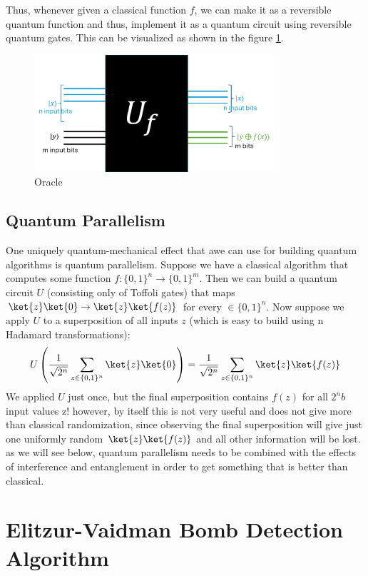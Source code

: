 \documentclass[12pt, oneside]{book}
\theoremstyle{definition}
\theoremstyle{definition}
\theoremstyle{remark}
\begin{document}
Thus, whenever given a classical function $f$, we can make it as a reversible quantum function and thus, implement
it as a quantum circuit using reversible quantum gates. This can be visualized as shown in the figure \ref{oracle}.
\begin{figure}[H]
    \centering
    \includegraphics[width=0.8\textwidth]{../images/oracle.png}
    \caption{Oracle}
    \label{oracle}
\end{figure}

\section{Quantum Parallelism}
One uniquely quantum-mechanical effect that awe can use for building quantum algorithms is quantum parallelism. Suppose we have a classical algorithm that computes some function $f:\{0,1\}^n \rightarrow \{0,1\}^m$. Then we can build a quantum circuit $U$ (consisting only of Toffoli gates) that maps $\ket{z}\ket{0}\rightarrow \ket{z}\ket{f(z)}$ for every $ \in \{0,1\}^n$. Now suppose we apply $U$ to a superposition of all inputs $z$ (which is easy to build using n Hadamard transformations):
\[
U\left(\frac{1}{\sqrt{2^n}} \sum_{z \in \{0,1\}^n} \ket{z}\ket{0}\right)=\frac{1}{\sqrt{2^n}}\sum_{z \in \{0,1\}^n} \ket{z}\ket{f(z)}
\]
We applied $U$ just once, but the final superposition contains $f(z)$ for all $2^nb$ input values z! however, by itself this is not very useful and does not give more than classical randomization, since observing the final superposition will give just one uniformly random $\ket{z}\ket{f(z)}$ and all other information will be lost. as we will see below, quantum parallelism needs to be combined with the effects of interference and entanglement in order to get something that is better than classical.
\chapter{Elitzur-Vaidman Bomb Detection Algorithm}
\end{document}
